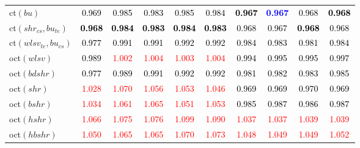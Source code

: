 \begin{tabular}[t]{l|ccccccccc}
ct$(bu)$ & \textcolor{black}{0.969} & \textcolor{black}{0.985} & \textcolor{black}{0.983} & \textcolor{black}{0.985} & \textcolor{black}{0.984} & \textcolor{black}{\textbf{0.967}} & \textcolor{blue}{\textbf{0.967}} & \textcolor{black}{0.968} & \textcolor{black}{\textbf{0.968}}\\
ct$(shr_{cs}, bu_{te})$ & \textcolor{black}{\textbf{0.968}} & \textcolor{black}{\textbf{0.984}} & \textcolor{black}{\textbf{0.983}} & \textcolor{black}{\textbf{0.984}} & \textcolor{black}{\textbf{0.983}} & \textcolor{black}{0.968} & \textcolor{black}{0.967} & \textcolor{black}{\textbf{0.968}} & \textcolor{black}{0.968}\\
ct$(wlsv_{te}, bu_{cs})$ & \textcolor{black}{0.977} & \textcolor{black}{0.991} & \textcolor{black}{0.991} & \textcolor{black}{0.992} & \textcolor{black}{0.992} & \textcolor{black}{0.984} & \textcolor{black}{0.983} & \textcolor{black}{0.981} & \textcolor{black}{0.984}\\
oct$(wlsv)$ & \textcolor{black}{0.989} & \textcolor{red}{1.002} & \textcolor{red}{1.004} & \textcolor{red}{1.003} & \textcolor{red}{1.004} & \textcolor{black}{0.994} & \textcolor{black}{0.995} & \textcolor{black}{0.995} & \textcolor{black}{0.997}\\
oct$(bdshr)$ & \textcolor{black}{0.977} & \textcolor{black}{0.989} & \textcolor{black}{0.991} & \textcolor{black}{0.992} & \textcolor{black}{0.992} & \textcolor{black}{0.981} & \textcolor{black}{0.982} & \textcolor{black}{0.983} & \textcolor{black}{0.985}\\
oct$(shr)$ & \textcolor{red}{1.028} & \textcolor{red}{1.070} & \textcolor{red}{1.056} & \textcolor{red}{1.053} & \textcolor{red}{1.046} & \textcolor{black}{0.969} & \textcolor{black}{0.969} & \textcolor{black}{0.970} & \textcolor{black}{0.969}\\
oct$(bshr)$ & \textcolor{red}{1.034} & \textcolor{red}{1.061} & \textcolor{red}{1.065} & \textcolor{red}{1.051} & \textcolor{red}{1.053} & \textcolor{black}{0.985} & \textcolor{black}{0.987} & \textcolor{black}{0.986} & \textcolor{black}{0.987}\\
oct$(hshr)$ & \textcolor{red}{1.066} & \textcolor{red}{1.075} & \textcolor{red}{1.076} & \textcolor{red}{1.099} & \textcolor{red}{1.090} & \textcolor{red}{1.037} & \textcolor{red}{1.037} & \textcolor{red}{1.039} & \textcolor{red}{1.039}\\
oct$(hbshr)$ & \textcolor{red}{1.050} & \textcolor{red}{1.065} & \textcolor{red}{1.065} & \textcolor{red}{1.070} & \textcolor{red}{1.073} & \textcolor{red}{1.048} & \textcolor{red}{1.049} & \textcolor{red}{1.049} & \textcolor{red}{1.052}\\

\end{tabular}
